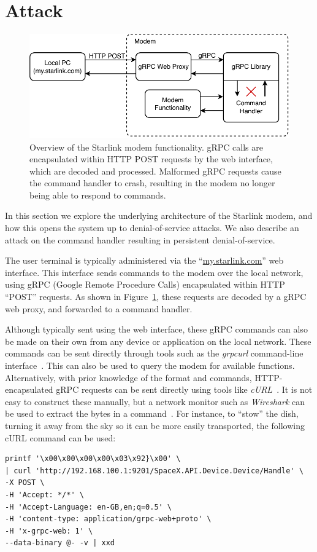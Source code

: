\section{Attack}\label{sec:attack}

\begin{figure}
    \centering\includegraphics[width=\columnwidth]{img/modem.pdf}
    \caption{Overview of the Starlink modem functionality. gRPC calls are encapsulated within HTTP POST requests by the web interface, which are decoded and processed. Malformed gRPC requests cause the command handler to crash, resulting in the modem no longer being able to respond to commands.}
    \label{fig:modem}
\end{figure}

In this section we explore the underlying architecture of the Starlink modem, and how this opens the system up to denial-of-service attacks.
We also describe an attack on the command handler resulting in persistent denial-of-service.

The user terminal is typically administered via the ``\url{my.starlink.com}'' web interface.
This interface sends commands to the modem over the local network, using gRPC (Google Remote Procedure Calls) encapsulated within HTTP ``POST'' requests.
As shown in Figure~\ref{fig:modem}, these requests are decoded by a gRPC web proxy, and forwarded to a command handler.

Although typically sent using the web interface, these gRPC commands can also be made on their own from any device or application on the local network.
These commands can be sent directly through tools such as the \textit{grpcurl} command-line interface~\cite{gRPCurl}.
This can also be used to query the modem for available functions.
Alternatively, with prior knowledge of the format and commands, HTTP-encapsulated gRPC requests can be sent directly using tools like \textit{cURL}~\cite{cURL}.
It is not easy to construct these manually, but a network monitor such as \textit{Wireshark} can be used to extract the bytes in a command~\cite{wireshark}.
For instance, to ``stow'' the dish, turning it away from the sky so it can be more easily transported, the following cURL command can be used:
\begin{lstlisting}
printf '\x00\x00\x00\x00\x03\x92}\x00' \
| curl 'http://192.168.100.1:9201/SpaceX.API.Device.Device/Handle' \
-X POST \
-H 'Accept: */*' \
-H 'Accept-Language: en-GB,en;q=0.5' \
-H 'content-type: application/grpc-web+proto' \
-H 'x-grpc-web: 1' \
--data-binary @- -v | xxd
\end{lstlisting}


